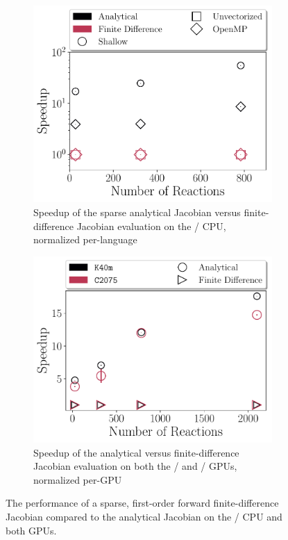 \documentclass[12pt,number,sort&compress,preprint]{elsarticle}
\begin{document}
\begin{figure}[htbp]
   \centering
  \begin{subfigure}[t]{0.48\linewidth}
      \includegraphics[width=\textwidth]{finite_difference_vs_analytical.pdf}
      \caption{Speedup of the sparse analytical Jacobian versus finite-difference Jacobian evaluation on the \avx/ CPU, normalized per-language}
      \label{F:fd_vs_analytical_cpu}
  \end{subfigure}
  \hfill
  \begin{subfigure}[t]{0.48\linewidth}
      \includegraphics[width=\textwidth]{finite_difference_vs_analytical_gpu.pdf}
      \caption{Speedup of the analytical versus finite-difference Jacobian evaluation on both the \gpunew/ and \gpuold/ GPUs, normalized per-GPU}
      \label{F:fd_vs_analytical_gpu}
  \end{subfigure}
  \caption{The performance of a sparse, first-order forward finite-difference Jacobian compared to the analytical Jacobian on the \avx/ CPU and both GPUs.}
  \label{F:fd_vs_analytical}
\end{figure}
\end{document}
